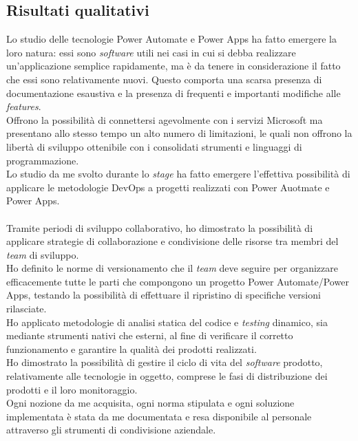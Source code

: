 \subsection{Risultati qualitativi}
Lo studio delle tecnologie Power Automate e Power Apps ha fatto emergere la loro natura: essi sono \emph{software} utili nei casi in cui si debba realizzare un'applicazione semplice rapidamente, ma è da tenere in considerazione il fatto che essi sono relativamente nuovi.
Questo comporta una scarsa presenza di documentazione esaustiva e la presenza di frequenti e importanti modifiche alle \emph{features}.\\
Offrono la possibilità di connettersi agevolmente con i servizi Microsoft ma presentano allo stesso tempo un alto numero di limitazioni, le quali non offrono la libertà di sviluppo ottenibile con i consolidati strumenti e linguaggi di programmazione.\\ 
Lo studio da me svolto durante lo \emph{stage} ha fatto emergere l'effettiva possibilità di applicare le metodologie \gls{DevOps} a progetti realizzati con Power Auotmate e Power Apps.\\\\
Tramite periodi di sviluppo collaborativo, ho dimostrato la possibilità di applicare strategie di collaborazione e condivisione delle risorse tra membri del \emph{team} di sviluppo.\\ 
Ho definito le norme di versionamento che il \emph{team} deve seguire per organizzare efficacemente tutte le parti che compongono un progetto Power Automate/Power Apps, testando la possibilità di effettuare il ripristino di specifiche versioni rilasciate.\\ 
Ho applicato metodologie di analisi statica del codice e \emph{testing} dinamico, sia mediante strumenti nativi che esterni, al fine di verificare il corretto funzionamento e garantire la qualità dei prodotti realizzati.\\ 
Ho dimostrato la possibilità di gestire il ciclo di vita del \emph{software} prodotto, relativamente alle tecnologie in oggetto, comprese le fasi di distribuzione dei prodotti e il loro monitoraggio.\\ 
Ogni nozione da me acquisita, ogni norma stipulata e ogni soluzione implementata è stata da me documentata e resa disponibile al personale attraverso gli strumenti di condivisione aziendale. 

